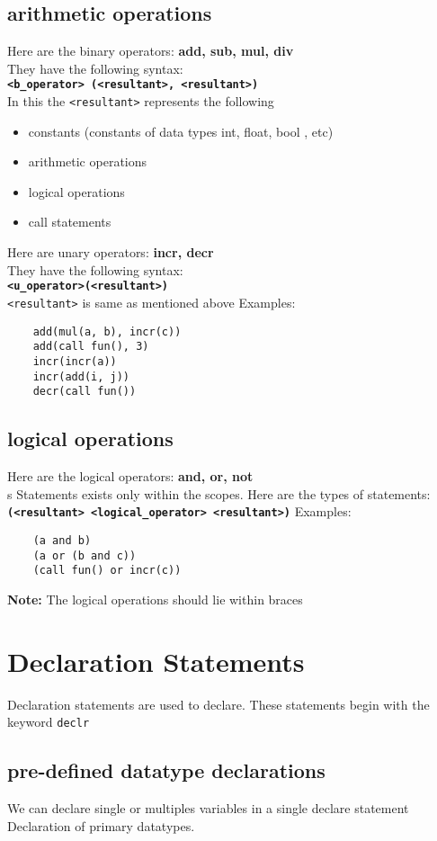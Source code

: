 \documentclass[journal, 18pt]{report}
\begin{document}
\subsection*{arithmetic operations}
Here are the binary operators: \textbf{add, sub, mul, div}\\
They have the following syntax:\\
\textbf{\texttt{<b\_operator> (<resultant>, <resultant>)}}\\
In this the \texttt{<resultant>} represents the following
\begin{itemize}
    \item constants (constants of data types int, float, bool , etc)
    \item arithmetic operations
    \item logical operations
    \item call statements
\end{itemize}
Here are unary operators: \textbf{incr, decr}\\
They have the following syntax:\\
\textbf{\texttt{<u\_operator>(<resultant>)}}\\
\texttt{<resultant>} is same as mentioned above
Examples:
\begin{lstlisting}
    add(mul(a, b), incr(c))
    add(call fun(), 3)
    incr(incr(a))
    incr(add(i, j))
    decr(call fun())
\end{lstlisting}
\subsection*{logical operations}
Here are the logical operators: \textbf{and, or, not}\\
s 
Statements exists only within the scopes. Here are the types of statements:\\
\textbf{\texttt{(<resultant> <logical\_operator> <resultant>)}}
Examples:
\begin{lstlisting}
    (a and b)
    (a or (b and c))
    (call fun() or incr(c))
\end{lstlisting}
\textbf{Note:} The logical operations should lie within braces
\section{Declaration Statements}
Declaration statements are used to declare. These statements begin with the keyword \texttt{declr}
\subsection{pre-defined datatype declarations}
We can declare single or multiples variables in a single declare statement
Declaration of primary datatypes.
\end{document}
